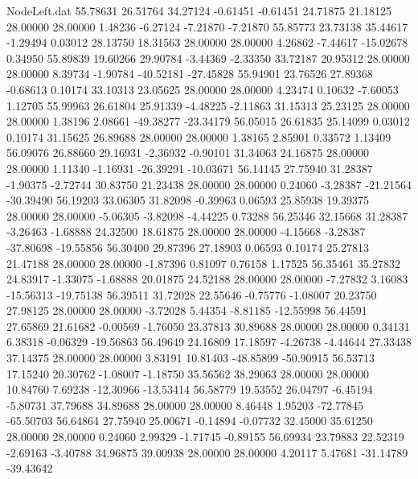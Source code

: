 \begin{filecontents}{NodeLeft.dat}
  55.78631   26.51764   34.27124    -0.61451   -0.61451   24.71875   21.18125   28.00000   28.00000    1.48236   -6.27124   -7.21870   -7.21870
  55.85773   23.73138   35.44617    -1.29494    0.03012   28.13750   18.31563   28.00000   28.00000    4.26862   -7.44617  -15.02678    0.34950
  55.89839   19.60266   29.90784    -3.44369   -2.33350   33.72187   20.95312   28.00000   28.00000    8.39734   -1.90784  -40.52181  -27.45828
  55.94901   23.76526   27.89368    -0.68613    0.10174   33.10313   23.05625   28.00000   28.00000    4.23474    0.10632   -7.60053    1.12705
  55.99963   26.61804   25.91339    -4.48225   -2.11863   31.15313   25.23125   28.00000   28.00000    1.38196    2.08661  -49.38277  -23.34179
  56.05015   26.61835   25.14099     0.03012    0.10174   31.15625   26.89688   28.00000   28.00000    1.38165    2.85901    0.33572    1.13409
  56.09076   26.88660   29.16931    -2.36932   -0.90101   31.34063   24.16875   28.00000   28.00000    1.11340   -1.16931  -26.39291  -10.03671
  56.14145   27.75940   31.28387    -1.90375   -2.72744   30.83750   21.23438   28.00000   28.00000    0.24060   -3.28387  -21.21564  -30.39490
  56.19203   33.06305   31.82098    -0.39963    0.06593   25.85938   19.39375   28.00000   28.00000   -5.06305   -3.82098   -4.44225    0.73288
  56.25346   32.15668   31.28387    -3.26463   -1.68888   24.32500   18.61875   28.00000   28.00000   -4.15668   -3.28387  -37.80698  -19.55856
  56.30400   29.87396   27.18903     0.06593    0.10174   25.27813   21.47188   28.00000   28.00000   -1.87396    0.81097    0.76158    1.17525
  56.35461   35.27832   24.83917    -1.33075   -1.68888   20.01875   24.52188   28.00000   28.00000   -7.27832    3.16083  -15.56313  -19.75138
  56.39511   31.72028   22.55646    -0.75776   -1.08007   20.23750   27.98125   28.00000   28.00000   -3.72028    5.44354   -8.81185  -12.55998
  56.44591   27.65869   21.61682    -0.00569   -1.76050   23.37813   30.89688   28.00000   28.00000    0.34131    6.38318   -0.06329  -19.56863
  56.49649   24.16809   17.18597    -4.26738   -4.44644   27.33438   37.14375   28.00000   28.00000    3.83191   10.81403  -48.85899  -50.90915
  56.53713   17.15240   20.30762    -1.08007   -1.18750   35.56562   38.29063   28.00000   28.00000   10.84760    7.69238  -12.30966  -13.53414
  56.58779   19.53552   26.04797    -6.45194   -5.80731   37.79688   34.89688   28.00000   28.00000    8.46448    1.95203  -72.77845  -65.50703
  56.64864   27.75940   25.00671    -0.14894   -0.07732   32.45000   35.61250   28.00000   28.00000    0.24060    2.99329   -1.71745   -0.89155
  56.69934   23.79883   22.52319    -2.69163   -3.40788   34.96875   39.00938   28.00000   28.00000    4.20117    5.47681  -31.14789  -39.43642

\end{filecontents}
